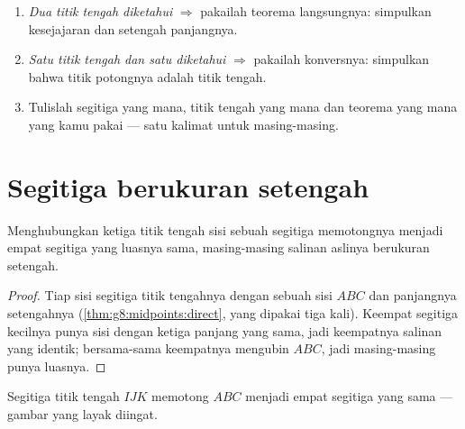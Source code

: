 \begin{method}\label{met:g8:midpoints:choose}
\begin{enumerate}
  \item \emph{Dua titik tengah diketahui} $\Rightarrow$ pakailah
        teorema langsungnya: simpulkan kesejajaran dan setengah
        panjangnya.
  \item \emph{Satu titik tengah dan satu  diketahui}
        $\Rightarrow$ pakailah konversnya: simpulkan bahwa titik
        potongnya adalah titik tengah.
  \item Tulislah segitiga yang mana, titik tengah yang mana dan
        teorema yang mana yang kamu pakai --- satu kalimat untuk
        masing-masing.
\end{enumerate}
\end{method}

\section{Segitiga berukuran setengah}

\begin{proposition}\label{prop:g8:midpoints:medial}
Menghubungkan ketiga titik tengah sisi sebuah segitiga memotongnya
menjadi empat segitiga yang luasnya sama, masing-masing salinan
aslinya berukuran setengah.
\end{proposition}

\begin{proof}
Tiap sisi segitiga titik tengahnya  dengan sebuah sisi $ABC$
dan panjangnya setengahnya (\cref{thm:g8:midpoints:direct}, yang
dipakai tiga kali). Keempat segitiga kecilnya punya sisi dengan ketiga
panjang yang sama, jadi keempatnya salinan yang identik; bersama-sama
keempatnya mengubin $ABC$, jadi masing-masing punya 
luasnya.
\end{proof}

\begin{omfigure}

{\small Segitiga titik tengah $IJK$ memotong $ABC$ menjadi empat
segitiga yang sama --- gambar yang layak diingat.}
\end{omfigure}

